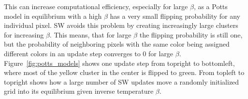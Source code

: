 \documentclass[12pt, twoside]{article}
\newcommand{\1}{\mathbb{1}}
\begin{document}

This can increase computational efficiency, especially for large $\beta$, as a Potts model in equilibrium with a high $\beta$ has a very small flipping probability for any individual pixel. SW avoids this problem by creating increasingly large clusters for increasing $\beta$. This means, that for large $\beta$ the flipping probability is still one, but the probability of neighboring pixels with the same color being assigned different colors in an update step converges to 0 for large $\beta$.
Figure~\ref{fig:potts_models} shows one update step from topright to bottomleft, where most of the yellow cluster in the center is flipped to green. From topleft to topright shows how a large number of SW updates move a randomly initialized grid into its equilibrium given inverse temperature $\beta$.
%
\end{document}
